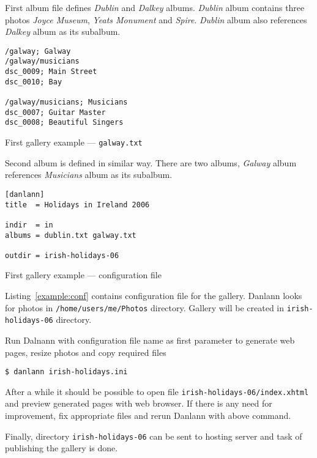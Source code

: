 \documentclass{article}
\begin{document}
First album file defines \textit{Dublin} and \textit{Dalkey} albums.
\textit{Dublin} album contains three photos \textit{Joyce Museum},
\textit{Yeats Monument} and \textit{Spire}. \textit{Dublin} album
also references \textit{Dalkey} album as its subalbum.

\begin{listing}
\begin{lstlisting}
/galway; Galway
/galway/musicians
dsc_0009; Main Street
dsc_0010; Bay

/galway/musicians; Musicians
dsc_0007; Guitar Master
dsc_0008; Beautiful Singers
\end{lstlisting}
\caption{First gallery example --- \texttt{galway.txt}}\label{example:album:galway}
\end{listing}

Second album is defined in similar way. There are two albums, \textit{Galway} album references
\textit{Musicians} album as its subalbum.

\begin{listing}
\begin{lstlisting}
[danlann]
title  = Holidays in Ireland 2006

indir  = in
albums = dublin.txt galway.txt

outdir = irish-holidays-06
\end{lstlisting}
\caption{First gallery example --- configuration file}\label{example:conf}
\end{listing}

Listing~\ref{example:conf} contains configuration file for the gallery.
Danlann looks for photos in \texttt{/home/users/me/Photos} directory.
Gallery will be created in \texttt{irish-holidays-06} directory.

Run Dalnann with configuration file name as first parameter to generate
web pages, resize photos and copy required files
\begin{verbatim}
$ danlann irish-holidays.ini
\end{verbatim}
After a while it should be possible to open file
\verb$irish-holidays-06/index.xhtml$ and preview generated pages
with web browser. If there is any need for improvement, fix appropriate
files and rerun Danlann with above command.

Finally, directory \texttt{irish-holidays-06} can be sent to hosting server
and task of publishing the gallery is done. 
\end{document}

